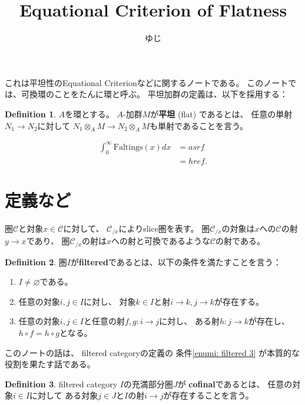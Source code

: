 \documentclass[uplatex]{jsarticle}
\title{Equational Criterion of Flatness}
\author{ゆじ}
\theoremstyle{definition}
\newtheorem{defi}[defi]{Definition}
\theoremstyle{plain}
\renewcommand{\emptyset}{\varnothing}
\newcommand{\mcC}{\mathcal{C}}
\begin{document}
\maketitle


これは平坦性のEquational Criterionなどに関するノートである。
このノートでは、可換環のことをたんに環と呼ぶ。
平坦加群の定義は、以下を採用する：

\begin{defi}
  \(A\)を環とする。
  \(A\)-加群\(M\)が\textbf{平坦} (flat) であるとは、
  任意の単射\(N_1\to N_2\)に対して
  \(N_1\otimes_AM\to N_2\otimes_AM\)も単射であることを言う。
\end{defi}


\begin{align}
  \int_0^{\infty}\mathrm{Faltings}(x) dx &= asrf \\
  &= href. %
\end{align}


\section{定義など}

圏\(\mcC\)と対象\(x\in \mcC\)に対して、
\(\mcC_{/x}\)によりslice圏を表す。
圏\(\mcC_{/x}\)の対象は\(x\)への\(\mcC\)の射\(y\to x\)であり、
圏\(\mcC_{/x}\)の射は\(x\)への射と可換であるような\(\mcC\)の射である。

\begin{defi}\label{defi: filtered}
  圏\(I\)が\textbf{filtered}であるとは、以下の条件を満たすことを言う：
  \begin{enumerate}
    \item
    \(I\neq \emptyset\)である。
    \item
    任意の対象\(i,j\in I\)に対し、
    対象\(k\in I\)と射\(i\to k, j\to k\)が存在する。
    \item \label{enumi: filtered 3}
    任意の対象\(i,j\in I\)と任意の射\(f,g:i\to j\)に対し、
    ある射\(h:j\to k\)が存在し、
    \(h\circ f = h\circ g\)となる。
  \end{enumerate}
\end{defi}

このノートの話は、
filtered categoryの定義の
条件\ref{enumi: filtered 3}
が本質的な役割を果たす話である。

\begin{defi}
  filtered category \(I\)の充満部分圏\(J\)が
  \textbf{cofinal}であるとは、
  任意の対象\(i\in I\)に対して
  ある対象\(j\in J\)と\(I\)の射\(i\to j\)が存在することを言う。
\end{defi}
\end{document}
